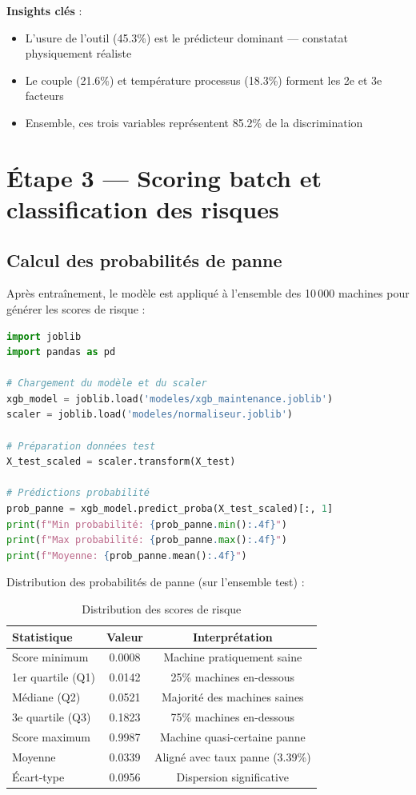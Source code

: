 \documentclass[a4paper,12pt,twoside]{report}
\begin{document}
\textbf{Insights clés} :
\begin{itemize}
    \item L'usure de l'outil (45.3\%) est le prédicteur dominant — constatat physiquement réaliste
    \item Le couple (21.6\%) et température processus (18.3\%) forment les 2e et 3e facteurs
    \item Ensemble, ces trois variables représentent 85.2\% de la discrimination
\end{itemize}

\section{Étape 3 — Scoring batch et classification des risques}

\subsection{Calcul des probabilités de panne}

Après entraînement, le modèle est appliqué à l'ensemble des 10\,000 machines pour générer les scores de risque :

\begin{lstlisting}[language=Python]
import joblib
import pandas as pd

# Chargement du modèle et du scaler
xgb_model = joblib.load('modeles/xgb_maintenance.joblib')
scaler = joblib.load('modeles/normaliseur.joblib')

# Préparation données test
X_test_scaled = scaler.transform(X_test)

# Prédictions probabilité
prob_panne = xgb_model.predict_proba(X_test_scaled)[:, 1]
print(f"Min probabilité: {prob_panne.min():.4f}")
print(f"Max probabilité: {prob_panne.max():.4f}")
print(f"Moyenne: {prob_panne.mean():.4f}")
\end{lstlisting}

Distribution des probabilités de panne (sur l'ensemble test) :

\begin{table}[H]
\centering
\small
\caption{Distribution des scores de risque}
\begin{tabular}{|l|c|c|}
\hline
\textbf{Statistique} & \textbf{Valeur} & \textbf{Interprétation} \\
\hline\hline
Score minimum & 0.0008 & Machine pratiquement saine \\
\hline
1er quartile (Q1) & 0.0142 & 25\% machines en-dessous \\
\hline
Médiane (Q2) & 0.0521 & Majorité des machines saines \\
\hline
3e quartile (Q3) & 0.1823 & 75\% machines en-dessous \\
\hline
Score maximum & 0.9987 & Machine quasi-certaine panne \\
\hline
Moyenne & 0.0339 & Aligné avec taux panne (3.39\%) \\
\hline
Écart-type & 0.0956 & Dispersion significative \\
\hline
\end{tabular}
\end{table}
\end{document}
